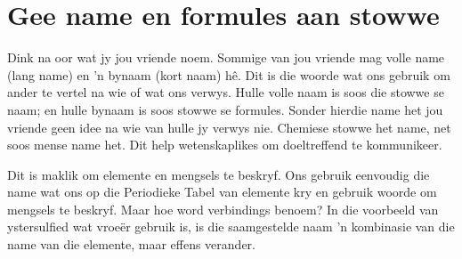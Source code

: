             \section{Gee name en formules aan stowwe}
            \nopagebreak
      \label{m38708*eip-379}Dink na oor wat jy jou vriende noem. Sommige van jou vriende mag volle name (lang name) en 'n bynaam (kort naam) hê. Dit is die woorde wat ons gebruik om ander te vertel na wie of wat ons verwys. Hulle volle naam is soos die stowwe se naam; en hulle bynaam is soos stowwe se formules. Sonder hierdie name het jou vriende geen idee na wie van hulle jy verwys nie. Chemiese stowwe het name, net soos mense name het. Dit help wetenskaplikes om doeltreffend te kommunikeer. 
     \par \label{m38708*id64028}Dit is maklik om elemente en mengsels te beskryf. Ons gebruik eenvoudig die name wat ons op die Periodieke Tabel van elemente kry en gebruik woorde om mengsels te beskryf. Maar hoe word verbindings benoem? In die voorbeeld van ystersulfied wat vroeër gebruik is, is die saamgestelde naam 'n kombinasie van die name van die elemente, maar effens verander. \par 


